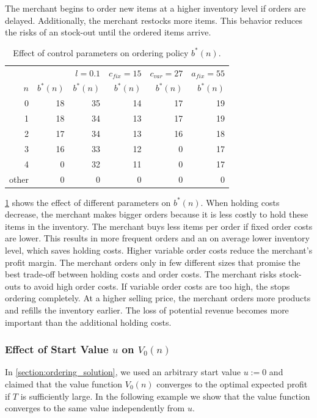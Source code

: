 The merchant begins to order new items at a higher inventory level if orders are delayed.
Additionally, the merchant restocks more items.
This behavior reduces the risks of an stock-out until the ordered items arrive.

\begin{table}
	\centering
	\begin{tabular}{rrrrrr}
		\toprule
		& & $l= 0.1$ & $c_{fix} = 15$ & $c_{var} = 27$ & $a_{fix} = 55$ \\
		$n$ & $b^*(n)$ & $b^*(n)$ & $b^*(n)$ & $b^*(n)$ & $b^*(n)$ \\
		\midrule
		0 & 18 & 35 & 14 & 17 & 19\\
		1 & 18 & 34 & 13 & 17 & 19\\
		2 & 17 & 34 & 13 & 16 & 18\\
		3 & 16 & 33 & 12 &  0 & 17\\
		4 &  0 & 32 & 11 &  0 & 17\\
		other & 0 & 0 & 0 & 0 &  0\\
		\bottomrule
	\end{tabular}
	\caption{Effect of control parameters on ordering policy $b^*(n).$}
	\label{table:order_policy_parameter}
\end{table}


\cref{table:order_policy_parameter} shows the effect of different parameters on $b^*(n)$.
When holding costs decrease, the merchant makes bigger orders because it is less costly to hold these items in the inventory.
The merchant buys less items per order if fixed order costs are lower.
This results in more frequent orders and an on average lower inventory level, which saves holding costs.
Higher variable order costs reduce the merchant's profit margin.
The merchant orders only in few different sizes that promise the best trade-off between holding costs and order costs.
The merchant risks stock-outs to avoid high order costs. 
If variable order costs are too high, the stops ordering completely.
At a higher selling price, the merchant orders more products and refills the inventory earlier.
The loss of potential revenue becomes more important than the additional holding costs.

\subsubsection{Effect of Start Value $u$ on $V_0(n)$}
In \cref{section:ordering_solution}, we used an arbitrary start value $u := 0$ and claimed that the value function $V_0(n)$ converges to the optimal expected profit if $T$ is sufficiently large.
In the following example we show that the value function converges to the same value independently from $u$.

